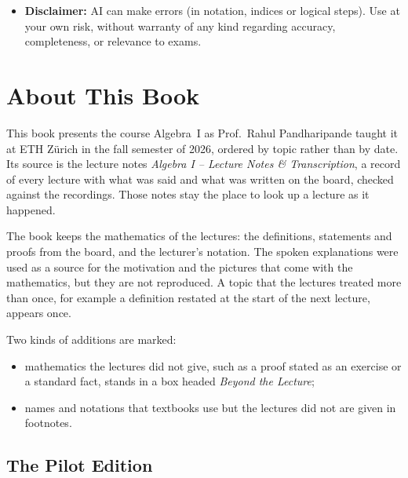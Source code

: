 \begin{titlepage}
\begin{minipage}{\textwidth}
\begin{tcolorbox}[
        arc=6pt,
        boxrule=0.8pt,
        colback=MidnightBlue!2!white,
        colframe=MidnightBlue!25!white,
        left=12pt, right=12pt, top=10pt, bottom=10pt
    ]
\begin{itemize}[leftmargin=1.5em, itemsep=3pt, topsep=0pt, parsep=0pt]
        \item[\textcolor{MidnightBlue!80!black}{\small\faExclamationTriangle}] \textbf{Disclaimer:} AI can make errors (in notation, indices or logical steps). Use at your own risk, without warranty of any kind regarding accuracy, completeness, or relevance to exams.
    \end{itemize}
    \end{tcolorbox}
\end{minipage}
\vspace*{0.5cm}
\end{titlepage}
\hypersetup{pageanchor=true}

\tableofcontents
\hypersetup{linkcolor=LinkColor}
\cleardoublepage

\chapter*{About This Book}

This book presents the course Algebra~I as Prof.\ Rahul Pandharipande taught it at ETH Z{\"u}rich in the fall semester of 2026, ordered by topic rather than by date. Its source is the lecture notes \emph{Algebra I -- Lecture Notes \& Transcription}, a record of every lecture with what was said and what was written on the board, checked against the recordings. Those notes stay the place to look up a lecture as it happened.

The book keeps the mathematics of the lectures: the definitions, statements and proofs from the board, and the lecturer's notation. The spoken explanations were used as a source for the motivation and the pictures that come with the mathematics, but they are not reproduced. A topic that the lectures treated more than once, for example a definition restated at the start of the next lecture, appears once.

Two kinds of additions are marked:
\begin{itemize}
    \item mathematics the lectures did not give, such as a proof stated as an exercise or a standard fact, stands in a box headed \emph{Beyond the Lecture};
    \item names and notations that textbooks use but the lectures did not are given in footnotes.
\end{itemize}

\section*{The Pilot Edition}

